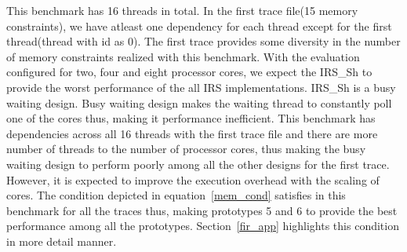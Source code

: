 This benchmark has 16 threads in total. 
In the first trace file(15 memory constraints), we have atleast one dependency for each thread except for the first thread(thread with id as 0). 
The first trace provides some diversity in the number of memory constraints realized with this benchmark. 
With the evaluation configured for two, four and eight processor cores, we expect the IRS\_Sh to provide the worst performance of the all IRS implementations. 
IRS\_Sh is a busy waiting design. 
Busy waiting design makes the waiting thread to constantly poll one of the cores thus, making it performance inefficient. 
This benchmark has dependencies across all 16 threads with the first trace file and there are more number of threads to the number of processor cores, thus making the busy waiting design to perform poorly among all the other designs for the first trace. 
However, it is expected to improve the execution overhead with the scaling of cores. 
The condition depicted in equation~\ref{mem_cond} satisfies in this benchmark for all the traces thus, making prototypes 5 and 6 to provide the best performance among all the prototypes. 
Section~\ref{fir_app} highlights this condition in more detail manner.  


